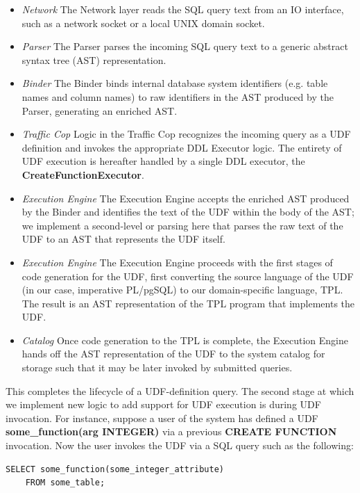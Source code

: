 \documentclass{vldb}
\newcommand{\dbCode}[1]{{\sffamily\small \textbf{#1}}\xspace}
\begin{document}
\begin{itemize}
    \item \textit{Network} The Network layer reads the SQL query text from an IO interface, such as a network socket or a local UNIX domain socket.
    \item \textit{Parser} The Parser parses the incoming SQL query text to a generic abstract syntax tree (AST) representation.
    \item \textit{Binder} The Binder binds internal database system identifiers (e.g. table names and column names) to raw identifiers in the AST produced by the Parser, generating an enriched AST.
    \item \textit{Traffic Cop} Logic in the Traffic Cop recognizes the incoming query as a UDF definition and invokes the appropriate DDL Executor logic. The entirety of UDF execution is hereafter handled by a single DDL executor, the \dbCode{CreateFunctionExecutor}.
    \item \textit{Execution Engine} The Execution Engine accepts the enriched AST produced by the Binder and identifies the text of the UDF within the body of the AST; we implement a second-level or parsing here that parses the raw text of the UDF to an AST that represents the UDF itself.
    \item \textit{Execution Engine} The Execution Engine proceeds with the first stages of code generation for the UDF, first converting the source language of the UDF (in our case, imperative PL/pgSQL) to our domain-specific language, TPL. The result is an AST representation of the TPL program that implements the UDF.
    \item \textit{Catalog} Once code generation to the TPL is complete, the Execution Engine hands off the AST representation of the UDF to the system catalog for storage such that it may be later invoked by submitted queries.
\end{itemize}

This completes the lifecycle of a UDF-definition query. The second stage at which we implement new logic to add support for UDF execution is during UDF invocation. For instance, suppose a user of the system has defined a UDF \dbCode{some\_function(arg INTEGER)} via a previous \dbCode{CREATE FUNCTION} invocation. Now the user invokes the UDF via a SQL query such as the following:

\begin{lstlisting}
SELECT some_function(some_integer_attribute)
    FROM some_table;
\end{lstlisting}
\end{document}
